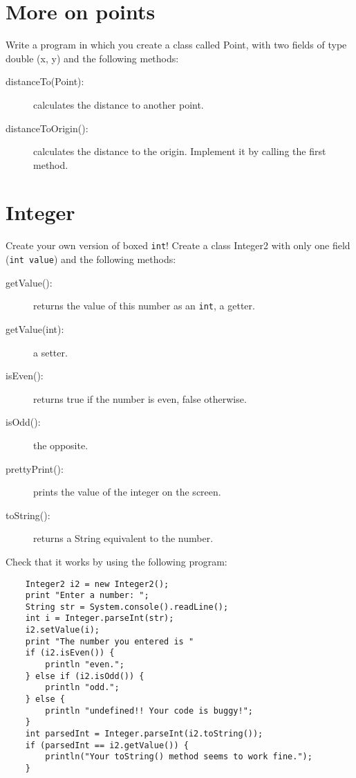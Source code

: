\documentclass{article}
\begin{document}
\section{More on points}
\label{sec:more-points}

Write a program in which you create a class called Point, 
with two fields of type double (x, y) and the
following methods: 

\begin{description}
\item[distanceTo(Point): ] calculates the distance to another point.
\item[distanceToOrigin(): ] calculates the distance to the
  origin. Implement it by calling the first method.

\end{description}

\section{Integer}
\label{sec:integer}

Create your own version of boxed \verb+int+! Create a class Integer2
with only one field (\verb+int value+) and the following methods: 

\begin{description}
\item[getValue(): ] returns the value of this number as an
  \verb+int+, a getter. 
\item[getValue(int): ] a setter.
\item[isEven(): ] returns true if the number is even, false
  otherwise.
\item[isOdd(): ] the opposite.
\item[prettyPrint(): ] prints the value of the integer on the screen.
\item[toString(): ] returns a String equivalent to the number. 
\end{description}

Check that it works by using the following program: 

\begin{verbatim}
    Integer2 i2 = new Integer2();
    print "Enter a number: ";
    String str = System.console().readLine();
    int i = Integer.parseInt(str);
    i2.setValue(i);
    print "The number you entered is " 
    if (i2.isEven()) {
        println "even.";
    } else if (i2.isOdd()) {
        println "odd.";
    } else {
        println "undefined!! Your code is buggy!";
    }
    int parsedInt = Integer.parseInt(i2.toString());
    if (parsedInt == i2.getValue()) {
        println("Your toString() method seems to work fine.");
    }
\end{verbatim}
\end{document}
